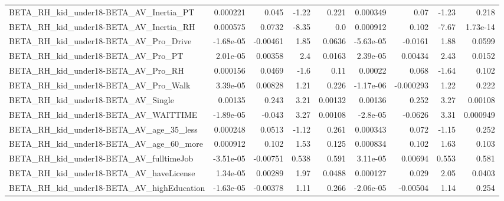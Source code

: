 \begin{tabular}{lrrrrrrrr}
BETA\_RH\_kid\_under18-BETA\_AV\_Inertia\_PT             &    0.000221 &        0.045 &    -1.22 &    0.221 &   0.000349 &        0.07 &        -1.23 &         0.218 \\
BETA\_RH\_kid\_under18-BETA\_AV\_Inertia\_RH             &    0.000575 &       0.0732 &    -8.35 &      0.0 &   0.000912 &       0.102 &        -7.67 &      1.73e-14 \\
BETA\_RH\_kid\_under18-BETA\_AV\_Pro\_Drive              &   -1.68e-05 &     -0.00461 &     1.85 &   0.0636 &  -5.63e-05 &     -0.0161 &         1.88 &        0.0599 \\
BETA\_RH\_kid\_under18-BETA\_AV\_Pro\_PT                 &    2.01e-05 &      0.00358 &      2.4 &   0.0163 &   2.39e-05 &     0.00434 &         2.43 &        0.0152 \\
BETA\_RH\_kid\_under18-BETA\_AV\_Pro\_RH                 &    0.000156 &       0.0469 &     -1.6 &     0.11 &    0.00022 &       0.068 &        -1.64 &         0.102 \\
BETA\_RH\_kid\_under18-BETA\_AV\_Pro\_Walk               &    3.39e-05 &      0.00828 &     1.21 &    0.226 &  -1.17e-06 &   -0.000293 &         1.22 &         0.222 \\
BETA\_RH\_kid\_under18-BETA\_AV\_Single                 &     0.00135 &        0.243 &     3.21 &  0.00132 &    0.00136 &       0.252 &         3.27 &       0.00108 \\
BETA\_RH\_kid\_under18-BETA\_AV\_WAITTIME               &   -1.89e-05 &       -0.043 &     3.27 &  0.00108 &   -2.8e-05 &     -0.0626 &         3.31 &      0.000949 \\
BETA\_RH\_kid\_under18-BETA\_AV\_age\_35\_less            &    0.000248 &       0.0513 &    -1.12 &    0.261 &   0.000343 &       0.072 &        -1.15 &         0.252 \\
BETA\_RH\_kid\_under18-BETA\_AV\_age\_60\_more            &    0.000912 &        0.102 &     1.53 &    0.125 &   0.000834 &       0.102 &         1.63 &         0.103 \\
BETA\_RH\_kid\_under18-BETA\_AV\_fulltimeJob            &   -3.51e-05 &     -0.00751 &    0.538 &    0.591 &   3.11e-05 &     0.00694 &        0.553 &         0.581 \\
BETA\_RH\_kid\_under18-BETA\_AV\_haveLicense            &    1.34e-05 &      0.00289 &     1.97 &   0.0488 &   0.000127 &       0.029 &         2.05 &        0.0403 \\
BETA\_RH\_kid\_under18-BETA\_AV\_highEducation          &   -1.63e-05 &     -0.00378 &     1.11 &    0.266 &  -2.06e-05 &    -0.00504 &         1.14 &         0.254 \\

\end{tabular}

